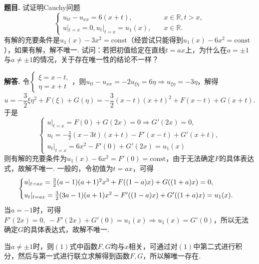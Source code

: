 \documentclass[12pt, a4paper, oneside]{ctexart}
\newcounter{problem}  %
\newenvironment{problem}{\stepcounter{problem}\par\noindent\textbf{题目\arabic{problem}. }}{\smallskip\par}
\newenvironment{solution}{\par\noindent\textbf{解答. }}{\smallskip\par}
\def\R{\mathbb{R}}          %
\def\add{\vspace{1ex}}      %
\begin{document}
\begin{problem}
    试证明Cauchy问题
    \begin{equation*}
        \begin{cases}
            u_{tt}-u_{xx} = 6(x+t),&\quad x\in\R,t > x,\\
            u|_{t=x} = 0, u_t|_{t=x}=u_1(x),&\quad x\in\R.
        \end{cases}
    \end{equation*}
    有解的充要条件是$u_1(x)-3x^2=\text{const}$（经尝试只能得到$u_1(x)-6x^2=\text{const}$），如果有解，解不唯一. 试问：若把初值给定在直线$t=ax$上，为什么在$a=\pm 1$与$a\neq \pm 1$的情况，关于存在唯一性的结论不一样？
\end{problem}
\begin{solution}
    令$\begin{cases}
        \xi = x-t,\\\eta = x+t
    \end{cases}$，则$u_{tt}-u_{xx} = -2u_{\xi\eta} = 6\eta\Rightarrow u_{\xi\eta} = -3\eta$，解得
    \begin{equation*}
        u = -\frac{3}{2}\xi\eta^2+F(\xi)+G(\eta) = -\frac{3}{2}(x-t)(x+t)^2+F(x-t)+G(x+t).
    \end{equation*}
    于是
    \begin{equation*}
        \begin{cases}
            u|_{t=x} = F(0)+G(2x) = 0\Rightarrow G'(2x) = 0,\\
            u_t = -\frac{3}{2}(x-3t)(x+t)-F'(x-t)+G'(x+t),\\
            u_t|_{t=x} = 6x^2-F'(0)+G'(2x) = u_1(x)
        \end{cases}
    \end{equation*}
    则有解的充要条件为$u_1(x) - 6x^2 = F'(0) = \text{const}$，由于无法确定$F$的具体表达式，故解不唯一. 一般的，令初值为$t = ax$，可得
    \begin{equation}
        \begin{cases}
            u|_{t=ax} = \frac{3}{2}(a-1)(a+1)^2x^3+F((1-a)x)+G((1+a)x)=0,\add\\
            u_t|_{t=ax} = \frac{3}{2}(3a-1)(a+1)x^2-F'((1-a)x)+G'((1+a)x)=u_1(x).
        \end{cases}
    \end{equation}
    当$a=-1$时，可得$F'(2x) = 0,\ -F'(2x)+G'(0) = u_1(x)\Rightarrow u_1(x) = G'(0)$，所以无法确定$G$的具体表达式，故解不唯一.

    当$a\neq \pm 1$时，则$(1)$式中函数$F,G$均与$x$相关，可通过对$(1)$中第二式进行积分，然后与第一式进行联立求解得到函数$F,G$，所以解唯一存在.
\end{solution}
\end{document}
